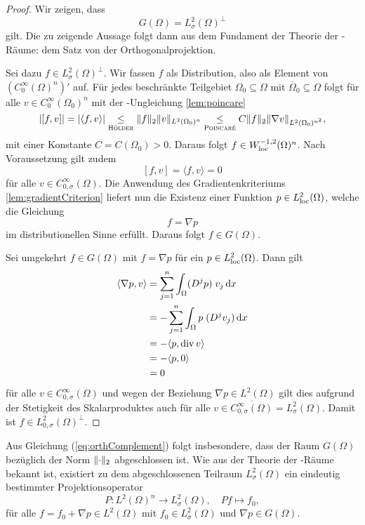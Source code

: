 \begin{proof}
  Wir zeigen, dass 
  \begin{equation}
    \label{eq:orthComplement}
    G(\Omega) = L_\sigma^2(\Omega)^\perp
  \end{equation}
  gilt.
  Die zu zeigende Aussage folgt dann aus dem Fundament der Theorie der \hilbert\hyp{}Räume: dem Satz von der Orthogonalprojektion.

  Sei dazu $f \in L_\sigma^2(\Omega)^\perp$.
  Wir fassen $f$ als Distribution, also als Element von $(C_0^\infty(\Omega)^n)'$ auf.
  Für jedes beschränkte Teilgebiet $\Omega_0 \subseteq \Omega$ mit $\overline\Omega_0 \subseteq \Omega$ folgt für alle $v \in C_0^\infty(\Omega_0)^n$ mit der \poincare\hyp{}Ungleichung \ref{lem:poincare}
  $$
  |[f, v]| 
  = |\langle f, v \rangle| 
  \underset{\hoelder}{\leq}  \norm{f}_2 \norm{v}_{L^2(\Omega_0)^n}
  \underset{\poincare}{\leq} C \norm{f}_2 \norm{\nabla v}_{L^2(\Omega_0)^{n^2}},
  $$
  mit einer Konstante $C = C(\Omega_0) > 0$.
  Daraus folgt $f \in W_{\loc}^{-1,2}(\Omega)^n$.
  Nach Voraussetzung gilt zudem 
  $$
  [f,v] = \langle f, v \rangle = 0
  $$
  für alle $v \in C_{0, \sigma}^\infty(\Omega)$.
  Die Anwendung des Gradientenkriteriums \ref{lem:gradientCriterion} liefert nun die Existenz einer Funktion $p \in L_{\loc}^2(\Omega)$, welche die Gleichung
  $$
  f = \nabla p
  $$
  im distributionellen Sinne erfüllt.
  Daraus folgt $f \in G(\Omega)$.

  Sei umgekehrt $f \in G(\Omega)$ mit $f = \nabla p$ für ein $p \in L^2_{\loc}(\Omega)$.
  Dann gilt
  \begin{align*}
  \langle \nabla p, v \rangle
  &= \sum_{j = 1}^n \int_\Omega (D^j p)\;v_j \d x \\
  &= - \sum_{j = 1}^n \int_\Omega p\;(D^j v_j) \d x \\
  &= - \langle p, \div v \rangle  \\
  &= - \langle p, 0 \rangle  \\
  &= 0
  \end{align*}
  für alle $v \in C_{0, \sigma}^\infty(\Omega)$ und wegen der Beziehung $\nabla p \in L^2(\Omega)$ gilt dies aufgrund der Stetigkeit des Skalarproduktes auch für alle $v \in \overline{C_{0, \sigma}^\infty(\Omega)} = L_\sigma^2(\Omega)$.
  Damit ist $f \in L_{0,\sigma}^2(\Omega)^\perp$.
\end{proof}

Aus Gleichung (\ref{eq:orthComplement}) folgt insbesondere, dass der Raum $G(\Omega)$ bezüglich der Norm $\norm{\cdot}_2$ abgeschlossen ist.
Wie aus der Theorie der \hilbert\hyp{}Räume bekannt ist, existiert zu dem abgeschlossenen Teilraum $L_\sigma^2(\Omega)$ ein eindeutig bestimmter Projektionsoperator
$$
P \colon L^2(\Omega)^n \to L_\sigma^2(\Omega),\quad Pf \mapsto f_0,
$$
für alle $f = f_0 + \nabla p \in L^2(\Omega)$ mit $f_0 \in L_\sigma^2(\Omega)$ und $\nabla p \in G(\Omega)$.

